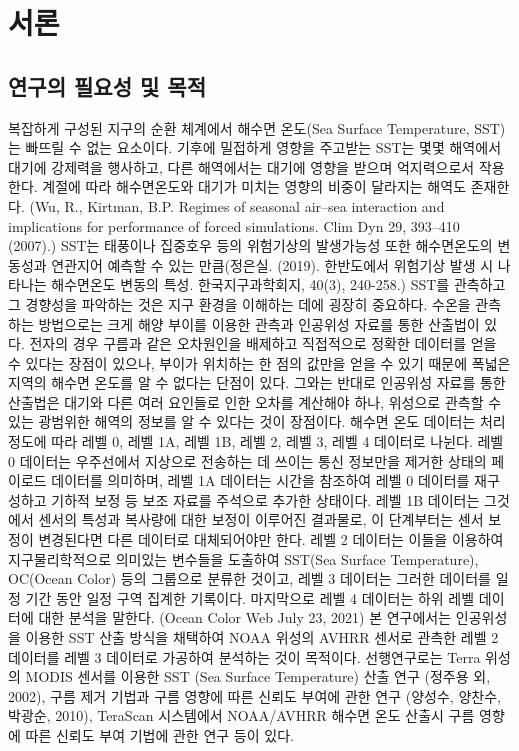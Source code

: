 \section{서론}

\subsection{연구의 필요성 및 목적}

복잡하게 구성된 지구의 순환 체계에서 해수면 온도(Sea Surface Temperature, SST)는 빠뜨릴 수 없는 요소이다. 기후에 밀접하게 영향을 주고받는 SST는 몇몇 해역에서 대기에 강제력을 행사하고, 다른 해역에서는 대기에 영향을 받으며 억지력으로서 작용한다. 계절에 따라 해수면온도와 대기가 미치는 영향의 비중이 달라지는 해역도 존재한다. (Wu, R., Kirtman, B.P. Regimes of seasonal air–sea interaction and implications for performance of forced simulations. Clim Dyn 29, 393–410 (2007).) SST는  태풍이나 집중호우 등의 위험기상의 발생가능성 또한 해수면온도의 변동성과 연관지어 예측할 수 있는 만큼(정은실. (2019). 한반도에서 위험기상 발생 시 나타나는 해수면온도 변동의 특성. 한국지구과학회지, 40(3), 240-258.) SST를 관측하고 그 경향성을 파악하는 것은 지구 환경을 이해하는 데에 굉장히 중요하다. 수온을 관측하는 방법으로는 크게 해양 부이를 이용한 관측과 인공위성 자료를 통한 산출법이 있다. 전자의 경우 구름과 같은 오차원인을 배제하고 직접적으로 정확한 데이터를 얻을 수 있다는 장점이 있으나, 부이가 위치하는 한 점의 값만을 얻을 수 있기 때문에 폭넓은 지역의 해수면 온도를 알 수 없다는 단점이 있다. 그와는 반대로 인공위성 자료를 통한 산출법은 대기와 다른 여러 요인들로 인한 오차를 계산해야 하나, 위성으로 관측할 수 있는 광범위한 해역의 정보를 알 수 있다는 것이 장점이다. 해수면 온도 데이터는 처리 정도에 따라 레벨 0, 레벨 1A, 레벨 1B, 레벨 2, 레벨 3, 레벨 4 데이터로 나뉜다. 레벨 0 데이터는 우주선에서 지상으로 전송하는 데 쓰이는 통신 정보만을 제거한 상태의 페이로드 데이터를 의미하며, 레벨 1A 데이터는 시간을 참조하여 레벨 0 데이터를 재구성하고 기하적 보정 등 보조 자료를 주석으로 추가한 상태이다. 레벨 1B 데이터는 그것에서 센서의 특성과 복사량에 대한 보정이 이루어진 결과물로, 이 단계부터는 센서 보정이 변경된다면 다른 데이터로 대체되어야만 한다. 레벨 2 데이터는 이들을 이용하여 지구물리학적으로 의미있는 변수들을 도출하여 SST(Sea Surface Temperature), OC(Ocean Color) 등의 그룹으로 분류한 것이고, 레벨 3 데이터는 그러한 데이터를 일정 기간 동안 일정 구역 집계한 기록이다. 마지막으로 레벨 4 데이터는 하위 레벨 데이터에 대한 분석을 말한다. (Ocean Color Web July 23, 2021) 본 연구에서는 인공위성을 이용한 SST 산출 방식을 채택하여 NOAA 위성의 AVHRR 센서로 관측한 레벨 2 데이터를 레벨 3 데이터로 가공하여 분석하는 것이 목적이다. 선행연구로는 Terra 위성의 MODIS 센서를 이용한 SST (Sea Surface Temperature) 산출 연구 (정주용 외, 2002), 구름 제거 기법과 구름 영향에 따른 신뢰도 부여에 관한 연구 (양성수, 양찬수, 박광순, 2010), TeraScan 시스템에서 NOAA/AVHRR 해수면 온도 산출시 구름 영향에 따른 신뢰도 부여 기법에 관한 연구 등이 있다.


